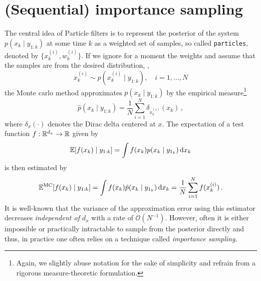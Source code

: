 \section*{(Sequential) importance sampling}
The central idea of Particle filters is to represent the posterior of
the system $p(x_k \mid y_{1:k})$ at some time $k$ as a weighted set of
samples, so called \texttt{particles}, denoted by
$\{ x^{(i)}_k, w^{(i)}_k \}.$ If we ignore for a moment the weights
and assume that the samples are from the desired distribution, \ie,
\[
  x^{(i)}_k \sim p(x_k^{(i)} \mid y_{1:k}), \quad i = 1, \dotsc, N
\]
the Monte carlo method approximates $p(x_k \mid y_{1:k})$ by the
empirical measure\footnote{Again, we slightly abuse notation for the
  sake of simplicity and refrain from a rigorous measure-theoretic
  formulation.}
\begin{equation}
  \label{eq:empirical_measure}
  \hat{p}(x_k \mid y_{1:k}) = \frac{1}{N} \sum_{i = 1}^N
  \delta_{x_k^{(i)}}(x_k)\,,
\end{equation}
where $\delta_x(\cdot)$ denotes the Dirac delta centered at $x$. The
expectation of a test function $f : \mathbb{R}^{d_x} \rightarrow \mathbb{R}$ given by
\[
  \mathbb{E}[f(x_k) \mid y_{1:k}] = \int f(x_k) p(x_k \mid y_{1_k})
  \,\mathrm{d}x_k
\]
is then estimated by
\[
  {\mathbb{E}}^{\text{MC}}[f(x_k) \mid y_{1:k}] = \int f(x_k)
  \hat{p}(x_k \mid y_{1_k}) \,\mathrm{d}x_k = \frac{1}{N} \sum_{i=1}^N
  f(x^{(i)}_k)\,.
\]
It is well-known that the variance of the approximation error using
this estimator decreases \emph{independent of $d_x$} with a rate of
$\mathcal{O}(N^{-1})$. However, often it is either impossible or
practically intractable to sample from the posterior directly and
thus, in practice one often relies on a technique called
\emph{importance sampling}.

